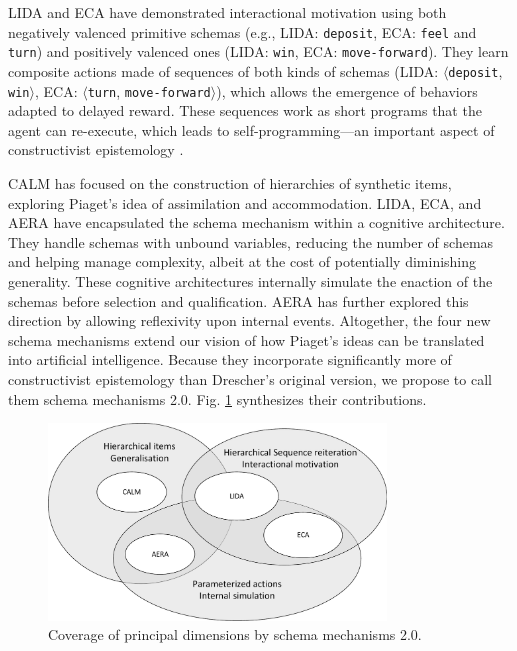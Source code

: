 \documentclass[runningheads]{llncs}
\begin{document}
LIDA and ECA have demonstrated interactional motivation using both negatively valenced primitive schemas (e.g., LIDA: \texttt{deposit}, ECA: \texttt{feel} and \texttt{turn}) and positively valenced ones (LIDA: \texttt{win}, ECA: \texttt{move-forward}).
They learn composite actions made of sequences of both kinds of schemas (LIDA: $\langle$\texttt{deposit}, \texttt{win}$\rangle$, ECA: $\langle$\texttt{turn}, \texttt{move-forward}$\rangle$), which allows the emergence of behaviors adapted to delayed reward.
These sequences work as short programs that the agent can re-execute,  which leads to self-programming---an important aspect of constructivist epistemology \cite{georgeon_cash_2019}.

CALM has focused on the construction of hierarchies of synthetic items, exploring Piaget's idea of assimilation and accommodation. 
LIDA, ECA, and AERA have encapsulated the schema mechanism within a cognitive architecture. 
They handle schemas with unbound variables, reducing the number of schemas and helping manage complexity, albeit at the cost of potentially diminishing generality. 
These cognitive architectures internally simulate the enaction of the schemas before selection and qualification. 
AERA has further explored this direction by allowing reflexivity upon internal events. 
Altogether, the four new schema mechanisms extend our vision of how Piaget's ideas can be translated into artificial intelligence. 
Because they incorporate significantly more of constructivist epistemology than Drescher's original version, we propose to call them schema mechanisms 2.0. 
Fig. \ref{fig:venn} synthesizes their contributions. 


\begin{figure}
	\centering
	\includegraphics[width=0.8\textwidth]{Figure_venn.pdf}
	\caption{Coverage of principal dimensions by schema mechanisms 2.0.} 
	\label{fig:venn}
\end{figure}
\end{document}
